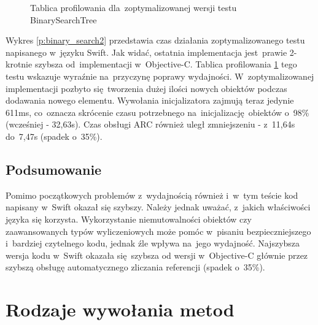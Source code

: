 \documentclass[mgr, shortabstract]{iithesis}
\begin{document}
\begin{figure}
    \caption{Tablica profilowania dla~zoptymalizowanej wersji testu BinarySearchTree}
    \label{i:binary_search2}
\end{figure}

Wykres \ref{p:binary_search2} przedstawia czas działania zoptymalizowanego testu napisanego w~języku Swift. Jak widać, ostatnia implementacja jest~prawie 2-krotnie szybsza od~implementacji w~Objective-C. Tablica profilowania \ref{i:binary_search2} tego testu wskazuje wyraźnie na~przyczynę poprawy wydajności. W~zoptymalizowanej implementacji pozbyto się tworzenia dużej ilości nowych obiektów podczas dodawania nowego elementu. Wywołania inicjalizatora zajmują teraz jedynie 611ms, co~oznacza skrócenie czasu potrzebnego na~inicjalizację obiektów o~98\% (wcześniej - 32,63s). Czas obsługi ARC również uległ zmniejszeniu - z~11,64s do~7,47s (spadek o~35\%). 

\subsection{Podsumowanie}

Pomimo początkowych problemów z~wydajnością również i~w~tym teście kod napisany w~Swift okazał się szybszy. Należy jednak uważać, z~jakich właściwości języka się korzysta. Wykorzystanie niemutowalności obiektów czy zaawansowanych typów wyliczeniowych może pomóc w~pisaniu bezpieczniejszego i~bardziej czytelnego kodu, jednak źle wpływa na~jego wydajność. Najszybsza wersja kodu w~Swift okazała się szybsza od wersji w~Objective-C głównie przez szybszą obsługę automatycznego zliczania referencji (spadek o~35\%).






\section{Rodzaje wywołania metod}
\label{s:wywolania_metod}
\end{document}

